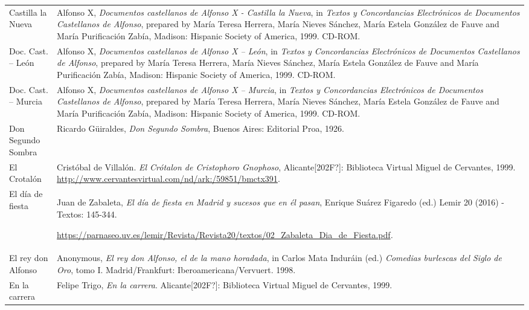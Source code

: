 \begin{flushleft}
\begin{supertabular}{m{1.7955599in}m{4.42126in}}
Castilla la Nueva  &
Alfonso X, \textit{Documentos castellanos de Alfonso X - Castilla la Nueva}, in \textit{Textos y Concordancias Electrónicos de Documentos Castellanos de Alfonso},\textit{ }prepared by María Teresa Herrera, María Nieves Sánchez, María Estela González de Fauve and María Purificación Zabía, Madison: Hispanic Society of America, 1999. CD-ROM.\\
Doc. Cast. – León  &
Alfonso X, \textit{Documentos castellanos de Alfonso X – León}, in \textit{Textos y Concordancias Electrónicos de Documentos Castellanos de Alfonso}, prepared by María Teresa Herrera, María Nieves Sánchez, María Estela González de Fauve and María Purificación Zabía, Madison: Hispanic Society of America, 1999. CD-ROM.\\
Doc. Cast. – Murcia  &
Alfonso X, \textit{Documentos castellanos de Alfonso X – Murcia}, in \textit{Textos y Concordancias Electrónicos de Documentos Castellanos de Alfonso},\textit{ }prepared by María Teresa Herrera, María Nieves Sánchez, María Estela González de Fauve and María Purificación Zabía, Madison: Hispanic Society of America, 1999. CD-ROM.\\
Don Segundo Sombra  &
Ricardo Güiraldes, \textit{Don Segundo Sombra}, Buenos Aires: Editorial Proa, 1926.\\
El Crotalón  &
Cristóbal de Villalón. \textit{El Crótalon de Cristophoro Gnophoso}, Alicante[202F?]: Biblioteca Virtual Miguel de Cervantes, 1999. \url{http://www.cervantesvirtual.com/nd/ark:/59851/bmctx391}.\\
El día de fiesta  &
Juan de Zabaleta,\textit{ El día de fiesta en Madrid y sucesos que en él pasan}, Enrique Suárez Figaredo (ed.) Lemir 20 (2016) - Textos: 145-344.

\url{https://parnaseo.uv.es/lemir/Revista/Revista20/textos/02_Zabaleta_Dia_de_Fiesta.pdf}\textit{.}\\
El rey don Alfonso  &
Anonymous, \textit{El rey don Alfonso, el de la mano horadada}, in Carlos Mata Induráin (ed.) \textit{Comedias burlescas del Siglo de Oro}, tomo I. Madrid/Frankfurt: Iberoamericana/Vervuert. 1998.\\
En la carrera  &
Felipe Trigo,\textit{ En la carrera}. Alicante[202F?]: Biblioteca Virtual Miguel de Cervantes, 1999.


\end{supertabular}
\end{flushleft}
